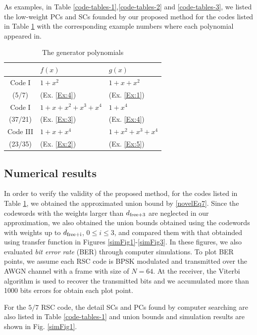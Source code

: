 As examples, in Table \ref{code-tables-1},\ref{code-tables-2} and \ref{code-tables-3}, we listed the low-weight PCs and SCs founded by our proposed method for the codes listed in Table \ref{TB:Codes} with the corresponding example numbers where each polynomial appeared in.
\begin{table}[htbp]
	\caption{The generator polynomials}
	\centering
	\begin{tabular}{cll} 
		\toprule
			& $f(x)$ & $g(x)$ \\ %
		\midrule
		Code I & $1+x^2$ & $1+x+x^2$\\
		(5/7) &  (Ex. \ref{Ex:4}) &  (Ex. \ref{Ex:1}) \\\hline
		Code I& $1+x+x^2+x^3+x^4$& $1+x^4$\\
		(37/21) &  (Ex. \ref{Ex:3}) &  (Ex. \ref{Ex:4})\\\hline
		Code III& $1+x+x^4$& $1+x^2+x^3+x^4$\\
		(23/35) &  (Ex. \ref{Ex:2}) &  (Ex. \ref{Ex:5})\\
		\bottomrule
	\end{tabular}
	\label{TB:Codes}
\end{table}

\subsection{Numerical results}

In order to verify the validity of the proposed method, for the codes listed in Table \ref{TB:Codes}, we obtained the approximated union bound by \eqref{novelEq7}. Since the codewords with the weights larger than $d_{\rm free+3}$ are neglected in our approximation, we also obtained the union bounds obtained using the codewords with weights up to $d_{\rm free+i}$, $0 \leq i \leq 3$, and compared them with that obtainded using transfer function in Figures \ref{simFig1}-\ref{simFig3}.
%
In these figures, we also evaluated {\it bit error rate} (BER) through computer simulations. To plot BER points, we assume each RSC code is BPSK modulated and transmitted over the AWGN channel with a frame with size of $N=64$. At the receiver, the Viterbi algorithm is used to recover the transmitted bits and we accumulated more than 1000 bits errors for obtain each plot point.

For the $5/7$ RSC code, the detail SCs and PCs found by computer searching are also listed in Table \ref{code-tables-1} and union bounds and simulation results are shown in Fig. \ref{simFig1}.

